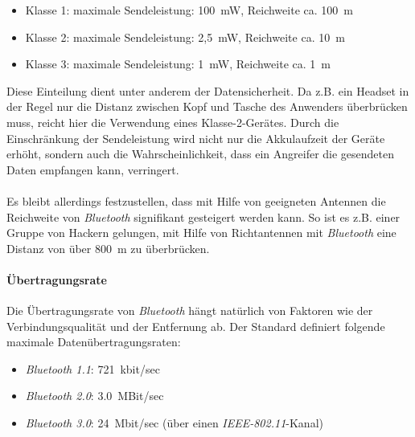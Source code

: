                 \begin{itemize}
                    \item{Klasse 1:} maximale Sendeleistung: 100~mW, Reichweite ca. 100~m
                    \item{Klasse 2:} maximale Sendeleistung: 2,5~mW, Reichweite ca. 10~m
                    \item{Klasse 3:} maximale Sendeleistung:   1~mW, Reichweite ca. 1~m
                \end{itemize}

                Diese Einteilung dient unter anderem der Datensicherheit. Da z.B. 
                ein Headset in der Regel nur die Distanz zwischen Kopf und Tasche
                des Anwenders überbrücken muss, reicht hier die Verwendung eines 
                Klasse-2-Gerätes. Durch die Einschränkung der Sendeleistung wird nicht nur die
                Akkulaufzeit der Geräte erhöht, sondern auch die Wahrscheinlichkeit,
                dass ein Angreifer die gesendeten Daten empfangen kann, verringert.\\
                \\
                Es bleibt allerdings festzustellen, dass mit Hilfe von geeigneten
                Antennen die Reichweite von \emph{Bluetooth} signifikant gesteigert werden
                kann. So ist es z.B. einer Gruppe von Hackern gelungen, mit Hilfe von
                Richtantennen mit \emph{Bluetooth} eine Distanz von über 800~m zu überbrücken.

            \paragraph{Übertragungsrate}
                Die Übertragungsrate von \emph{Bluetooth} hängt natürlich von Faktoren wie
                der Verbindungsqualität und der Entfernung ab. Der Standard definiert
                folgende maximale Datenübertragungsraten:

                \begin{itemize}
                    \item{\emph{Bluetooth 1.1}:} 721~kbit/sec
                    \item{\emph{Bluetooth 2.0}:} 3.0~MBit/sec
                    \item{\emph{Bluetooth 3.0}:} 24~Mbit/sec (über einen \emph{IEEE-802.11}-Kanal)
                \end{itemize}

